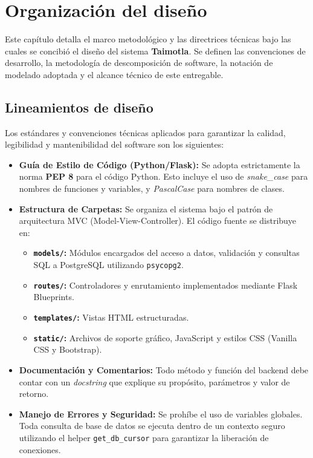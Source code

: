 \chapter{Organización del diseño}
\label{cap:organizacionDiseno}

Este capítulo detalla el marco metodológico y las directrices técnicas bajo las cuales se concibió el diseño del sistema \textbf{Taimotla}. Se definen las convenciones de desarrollo, la metodología de descomposición de software, la notación de modelado adoptada y el alcance técnico de este entregable.

\section{Lineamientos de diseño}
\label{sec:lineamientosDiseno}

Los estándares y convenciones técnicas aplicados para garantizar la calidad, legibilidad y mantenibilidad del software son los siguientes:

\begin{itemize}
    \item \textbf{Guía de Estilo de Código (Python/Flask):} Se adopta estrictamente la norma \textbf{PEP 8} para el código Python. Esto incluye el uso de \textit{snake\_case} para nombres de funciones y variables, y \textit{PascalCase} para nombres de clases.
    \item \textbf{Estructura de Carpetas:} Se organiza el sistema bajo el patrón de arquitectura MVC (Model-View-Controller). El código fuente se distribuye en:
    \begin{itemize}
        \item \textbf{\texttt{models/}:} Módulos encargados del acceso a datos, validación y consultas SQL a PostgreSQL utilizando \texttt{psycopg2}.
        \item \textbf{\texttt{routes/}:} Controladores y enrutamiento implementados mediante Flask Blueprints.
        \item \textbf{\texttt{templates/}:} Vistas HTML estructuradas.
        \item \textbf{\texttt{static/}:} Archivos de soporte gráfico, JavaScript y estilos CSS (Vanilla CSS y Bootstrap).
    \end{itemize}
    \item \textbf{Documentación y Comentarios:} Todo método y función del backend debe contar con un \textit{docstring} que explique su propósito, parámetros y valor de retorno.
    \item \textbf{Manejo de Errores y Seguridad:} Se prohíbe el uso de variables globales. Toda consulta de base de datos se ejecuta dentro de un contexto seguro utilizando el helper \texttt{get\_db\_cursor} para garantizar la liberación de conexiones.
\end{itemize}

